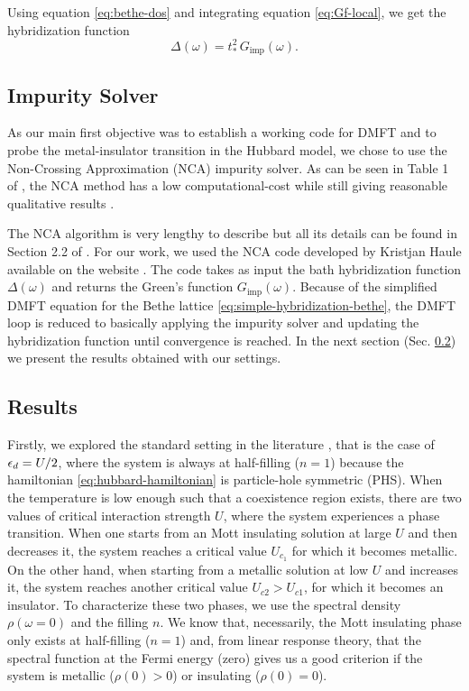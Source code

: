 \documentclass[12pt]{report}
\begin{document}
Using equation \ref{eq:bethe-dos} and integrating equation \ref{eq:Gf-local}, we get the hybridization function \cite{thesis_bruno}
\begin{equation} \label{eq:simple-hybridization-bethe}
\Delta(\omega) = t_*^2 \, G_{\text{imp}}(\omega).
\end{equation}

\subsection{Impurity Solver} \label{sec:impurity-solver}

As our main first objective was to establish a working code for DMFT and to probe the metal-insulator transition in the Hubbard model, we chose to use the Non-Crossing Approximation (NCA) impurity solver. As can be seen in Table 1 of \cite{impurity-solvers}, the NCA method has a low computational-cost while still giving reasonable qualitative results \cite{haule_real_materials, vildosola2015}.

The NCA algorithm is very lengthy to describe but all its details can be found in Section 2.2 of \cite{thesis_bruno}. For our work, we used the NCA code developed by Kristjan Haule available on the website \cite{hauleweb}. The code takes as input the bath hybridization function $\Delta(\omega)$ and returns the Green's function $G_{\text{imp}}(\omega)$. Because of the simplified DMFT equation for the Bethe lattice \ref{eq:simple-hybridization-bethe}, the DMFT loop is reduced to basically applying the impurity solver and updating the hybridization function until convergence is reached. In the next section (Sec. \ref{sec:results}) we present the results obtained with our settings.

\subsection{Results} \label{sec:results}

Firstly, we explored the standard setting in the literature \cite{georges1996}, that is the case of $\epsilon_d = U/2$, where the system is always at half-filling ($n=1$) because the hamiltonian \ref{eq:hubbard-hamiltonian} is particle-hole symmetric (PHS). When the temperature is low enough such that a coexistence region exists, there are two values of critical interaction strength $U$, where the system experiences a phase transition. When one starts from an Mott insulating solution at large $U$ and then decreases it, the system reaches a critical value $U_{c_1}$ for which it becomes metallic. On the other hand, when starting from a metallic solution at low $U$ and increases it, the system reaches another critical value $U_{c2} > U_{c1}$, for which it becomes an insulator. To characterize these two phases, we use the spectral density $\rho(\omega = 0)$ and the filling $n$. We know that, necessarily, the Mott insulating phase only exists at half-filling ($n=1$) \cite{georges1996} and, from linear response theory, that the spectral function at the Fermi energy (zero) gives us a good criterion if the system is metallic ($\rho(0) > 0$) or insulating ($\rho(0) = 0$).
\end{document}

